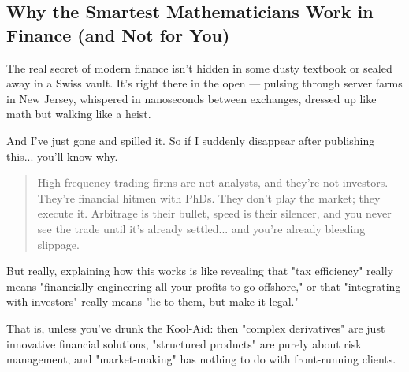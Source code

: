 \subsection{Why the Smartest Mathematicians Work in Finance (and Not for You)}

The real secret of modern finance isn’t hidden in some dusty textbook or sealed away in a Swiss vault. It’s right there in the open — pulsing through server farms in New Jersey, whispered in nanoseconds between exchanges, dressed up like math but walking like a heist.

And I’ve just gone and spilled it. So if I suddenly disappear after publishing this... you'll know why. 

\begin{quote}
High-frequency trading firms are not analysts, and they’re not investors. They’re financial hitmen with PhDs. They don’t play the market; they execute it. Arbitrage is their bullet, speed is their silencer, and you never see the trade until it’s already settled... and you’re already bleeding slippage.
\end{quote}

But really, explaining how this works is like revealing that "tax efficiency" really means "financially engineering all your profits to go offshore," or that "integrating with investors" really means "lie to them, but make it legal."

That is, unless you’ve drunk the Kool-Aid: then "complex derivatives" are just innovative financial solutions, "structured products" are purely about risk management, and "market-making" has nothing to do with front-running clients.

